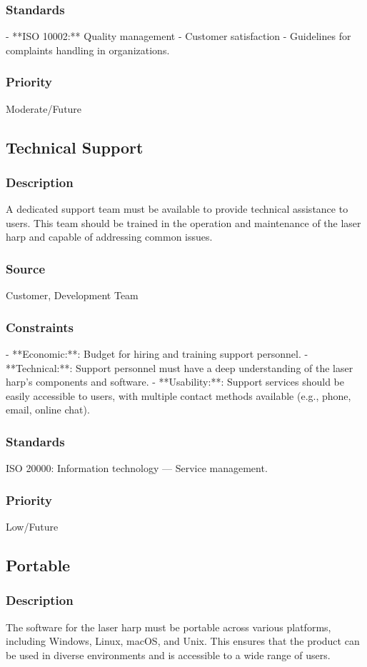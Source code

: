 \subsubsection{Standards}
- **ISO 10002:** Quality management - Customer satisfaction - Guidelines for complaints handling in organizations.
\subsubsection{Priority}
Moderate/Future


\subsection{Technical Support}
\subsubsection{Description}
A dedicated support team must be available to provide technical assistance to users. This team should be trained in the operation and maintenance of the laser harp and capable of addressing common issues.
\subsubsection{Source}
Customer, Development Team
\subsubsection{Constraints}- **Economic:**: Budget for hiring and training support personnel.
- **Technical:**: Support personnel must have a deep understanding of the laser harp's components and software.
- **Usability:**: Support services should be easily accessible to users, with multiple contact methods available (e.g., phone, email, online chat).
\subsubsection{Standards}
ISO 20000: Information technology — Service management.
\subsubsection{Priority}
Low/Future


\subsection{Portable}
\subsubsection{Description}
The software for the laser harp must be portable across various platforms, including Windows, Linux, macOS, and Unix. This ensures that the product can be used in diverse environments and is accessible to a wide range of users.
